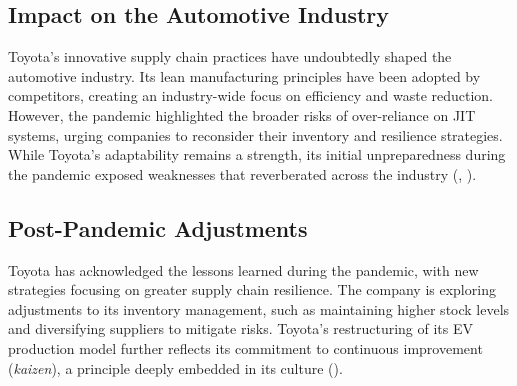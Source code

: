 \subsection{Impact on the Automotive Industry}
Toyota’s innovative supply chain practices have undoubtedly shaped the automotive industry. Its lean manufacturing principles have been adopted by competitors, creating an industry-wide focus on efficiency and waste reduction. However, the pandemic highlighted the broader risks of over-reliance on JIT systems, urging companies to reconsider their inventory and resilience strategies. While Toyota’s adaptability remains a strength, its initial unpreparedness during the pandemic exposed weaknesses that reverberated across the industry (\cite{everythingsupplychain}, \cite{austin2023}).

\subsection{Post-Pandemic Adjustments}
Toyota has acknowledged the lessons learned during the pandemic, with new strategies focusing on greater supply chain resilience. The company is exploring adjustments to its inventory management, such as maintaining higher stock levels and diversifying suppliers to mitigate risks. Toyota’s restructuring of its EV production model further reflects its commitment to continuous improvement (\textit{kaizen}), a principle deeply embedded in its culture (\cite{austin2023}).


